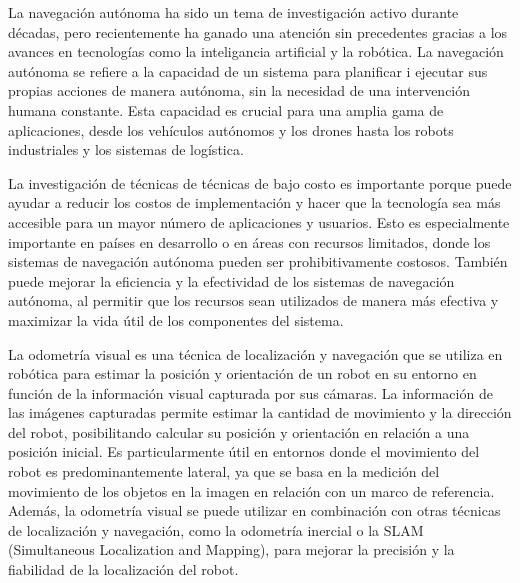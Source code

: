 \documentclass[
11pt, %
codirector, %
]{charter}
\begin{document}



La navegación autónoma ha sido un tema de investigación activo durante décadas, pero recientemente ha ganado una atención sin precedentes gracias a los avances en tecnologías como la inteligancia artificial y la robótica. La navegación autónoma se refiere a la capacidad de un sistema para planificar i ejecutar sus propias acciones de manera autónoma, sin la necesidad de una intervención humana constante. Esta capacidad es crucial para una amplia gama de aplicaciones, desde los vehículos autónomos y los drones hasta los robots industriales y los sistemas de logística.

La investigación de técnicas de técnicas de bajo costo es importante porque puede ayudar a reducir los costos de implementación y hacer que la tecnología sea más accesible para un mayor número de aplicaciones y usuarios. Esto es especialmente importante en países en desarrollo o en áreas con recursos limitados, donde los sistemas de navegación autónoma pueden ser prohibitivamente costosos. También puede mejorar la eficiencia y la efectividad de los sistemas de navegación autónoma, al permitir que los recursos sean utilizados de manera más efectiva y maximizar la vida útil de los componentes del sistema.

La odometría visual es una técnica de localización y navegación que se utiliza en robótica para estimar la posición y orientación de un robot en su entorno en función de la información visual capturada por sus cámaras. La información de las imágenes capturadas permite estimar la cantidad de movimiento y la dirección del robot, posibilitando calcular su posición y orientación en relación a una posición inicial. Es particularmente útil en entornos donde el movimiento del robot es predominantemente lateral, ya que se basa en la medición del movimiento de los objetos en la imagen en relación con un marco de referencia. Además, la odometría visual se puede utilizar en combinación con otras técnicas de localización y navegación, como la odometría inercial o la SLAM (Simultaneous Localization and Mapping), para mejorar la precisión y la fiabilidad de la localización del robot.
\end{document}
